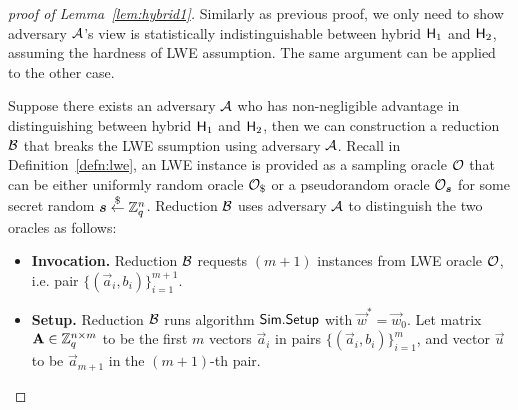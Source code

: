 \begin{proof}[proof of Lemma~\ref{lem:hybrid1}]
Similarly as previous proof, we only need to show adversary $\mathcal{A}$'s view is statistically indistinguishable between hybrid $\mathsf{H}_1$ and $\mathsf{H}_2$, assuming the hardness of LWE assumption. The same argument can be applied to the other case. 

Suppose there exists an adversary $\mathcal{A}$ who has non-negligible advantage in distinguishing between hybrid $\mathsf{H}_1$ and $\mathsf{H}_2$, then we can construction a reduction $\mathcal{B}$ that breaks the LWE ssumption using adversary $\mathcal{A}$. Recall in Definition~\ref{defn:lwe}, an LWE instance is provided as a sampling oracle $\mathcal{O}$ that can be either uniformly random oracle $\mathcal{O}_{\$}$ or a pseudorandom oracle $\mathcal{O}_{\boldsymbol{s}}$ for some secret random $\boldsymbol{s} \overset{\$}{\leftarrow} \mathbb{Z}_q^{n}$. Reduction $\mathcal{B}$ uses adversary $\mathcal{A}$ to distinguish the two oracles as follows:
\begin{itemize}[leftmargin=*]
 \item\textbf{Invocation.} Reduction $\mathcal{B}$ requests $(m + 1)$ instances from LWE oracle $\mathcal{O}$, i.e. pair $\{(\vec{a}_i, b_i)\}_{i = 1}^{m + 1}$.
 \item\textbf{Setup.} Reduction $\mathcal{B}$ runs algorithm $\mathsf{Sim}.\mathsf{Setup}$ with $\vec{w}^* = \vec{w}_0$. Let matrix $\mathbf{A} \in \mathbb{Z}_q^{n \times m}$ to be the first $m$ vectors $\vec{a}_i$ in pairs $\{(\vec{a}_i, b_i)\}_{i = 1}^m$, and vector $\vec{u}$ to be $\vec{a}_{m + 1}$ in the $(m + 1)$-th pair.
 

\end{itemize}
\end{proof}
